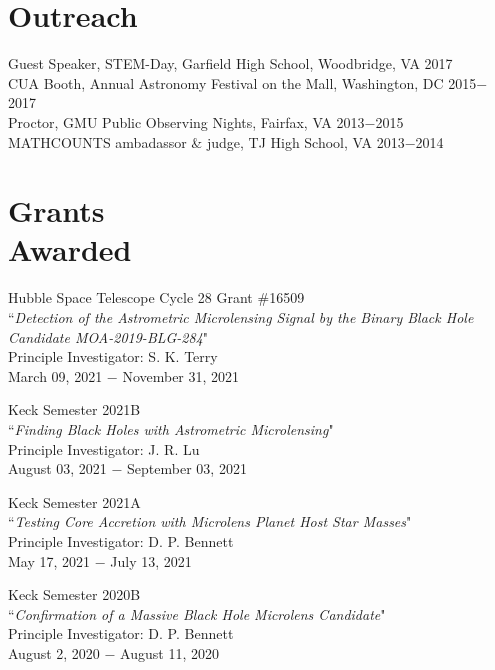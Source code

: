 \documentclass[margin,line]{res}
\begin{document}
\begin{resume}
\section{\sc Outreach}
Guest Speaker, STEM-Day, Garfield High School, Woodbridge, VA \hfill 2017 \\
CUA Booth, Annual Astronomy Festival on the Mall, Washington, DC \hfill 2015$-$2017 \\
Proctor, GMU Public Observing Nights, Fairfax, VA \hfill 2013$-$2015 \\
MATHCOUNTS ambadassor \& judge, TJ High School, VA \hfill 2013$-$2014 \\

\section{\sc Grants \\ Awarded}
Hubble Space Telescope Cycle 28 Grant \#16509 \\
``\textit{Detection of the Astrometric Microlensing Signal by the Binary Black Hole Candidate MOA-2019-BLG-284}" \\
Principle Investigator: S. K. Terry \\
March 09, 2021 $-$ November 31, 2021

Keck Semester 2021B \\
``\textit{Finding Black Holes with Astrometric Microlensing}" \\
Principle Investigator: J. R. Lu\\
August 03, 2021 $-$ September 03, 2021

Keck Semester 2021A \\
``\textit{Testing Core Accretion with Microlens Planet Host Star Masses}" \\
Principle Investigator: D. P. Bennett\\
May 17, 2021 $-$ July 13, 2021

Keck Semester 2020B \\
``\textit{Confirmation of a Massive Black Hole Microlens Candidate}" \\
Principle Investigator: D. P. Bennett\\
August 2, 2020 $-$ August 11, 2020


\end{resume}
\end{document}
